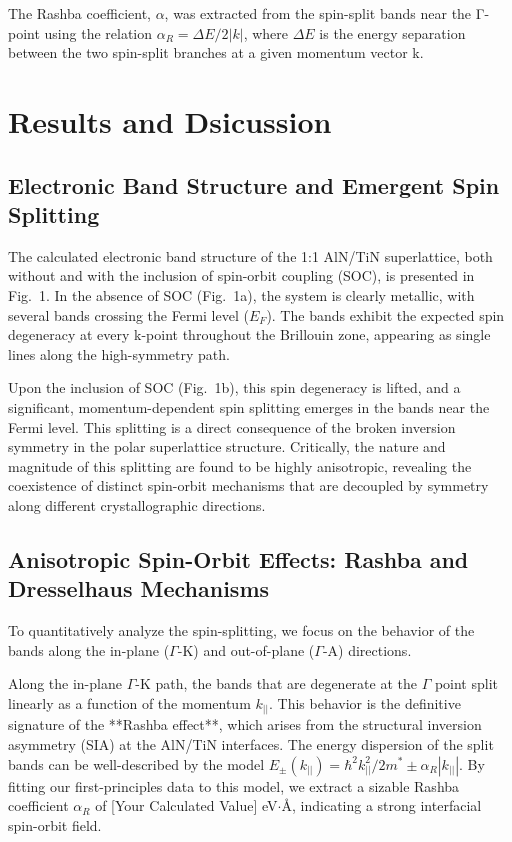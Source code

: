 \documentclass[aps,prl,reprint,superscriptaddress]{revtex4-2}
\begin{document}
The Rashba coefficient, $\alpha$, was extracted from the spin-split bands near the Γ-point using the relation $\alpha_R = \Delta E/2|k| $, where $\Delta E$ is the energy separation between the two spin-split branches at a given momentum vector k.
 
\section{Results and Dsicussion}

\subsection{Electronic Band Structure and Emergent Spin Splitting}

The calculated electronic band structure of the 1:1 AlN/TiN superlattice, both without and with the inclusion of spin-orbit coupling (SOC), is presented in Fig.~1. In the absence of SOC (Fig.~1a), the system is clearly metallic, with several bands crossing the Fermi level ($E_F$). The bands exhibit the expected spin degeneracy at every k-point throughout the Brillouin zone, appearing as single lines along the high-symmetry path.

Upon the inclusion of SOC (Fig.~1b), this spin degeneracy is lifted, and a significant, momentum-dependent spin splitting emerges in the bands near the Fermi level. This splitting is a direct consequence of the broken inversion symmetry in the polar superlattice structure. Critically, the nature and magnitude of this splitting are found to be highly anisotropic, revealing the coexistence of distinct spin-orbit mechanisms that are decoupled by symmetry along different crystallographic directions.

\subsection{Anisotropic Spin-Orbit Effects: Rashba and Dresselhaus Mechanisms}

To quantitatively analyze the spin-splitting, we focus on the behavior of the bands along the in-plane ($\Gamma$-K) and out-of-plane ($\Gamma$-A) directions.

Along the in-plane $\Gamma$-K path, the bands that are degenerate at the $\Gamma$ point split linearly as a function of the momentum $k_{||}$. This behavior is the definitive signature of the **Rashba effect**, which arises from the structural inversion asymmetry (SIA) at the AlN/TiN interfaces. The energy dispersion of the split bands can be well-described by the model $E_{\pm}(k_{||}) = \hbar^2 k_{||}^2 / 2m^* \pm \alpha_R |k_{||}|$. By fitting our first-principles data to this model, we extract a sizable Rashba coefficient $\alpha_R$ of [Your Calculated Value] eV$\cdot$\AA, indicating a strong interfacial spin-orbit field.
\end{document}
